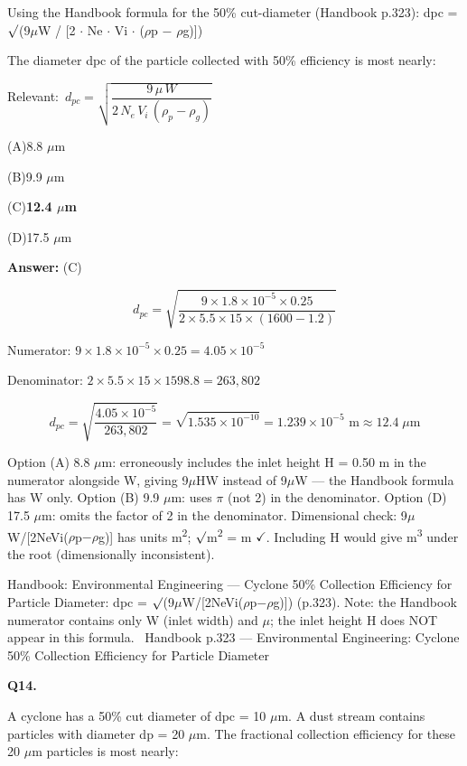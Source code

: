 \documentclass[11pt]{article}
\newcommand{\correct}[1]{\textbf{#1}\;{\color{accent}$\checkmark$}}
\newcommand{\optline}[2]{\par\noindent\hspace{1.2em}(#1)\hspace{0.6em}#2}
\begin{document}
Using the Handbook formula for the 50\% cut-diameter (Handbook p.323):
dpc = $\surd$(9$\mu$W / [2 $\cdot$ Ne $\cdot$ Vi $\cdot$ ($\rho$p $-$ $\rho$g)])

The diameter dpc of the particle collected with 50\% efficiency is most nearly:\par\vspace{3pt}
{\small\color{soft}Relevant:}\ $d_{pc} = \sqrt{\dfrac{9\,\mu\,W}{2\,N_e\,V_i\,(\rho_p - \rho_g)}}$\par\vspace{3pt}
\optline{A}{8.8 $\mu$m}
\optline{B}{9.9 $\mu$m}
\optline{C}{\correct{12.4 $\mu$m}}
\optline{D}{17.5 $\mu$m}
\par\vspace{3pt}
\vspace{2pt}\par\noindent\colorbox{boxbg}{\parbox{\dimexpr\linewidth-2\fboxsep\relax}{%
\vspace{2pt}\textbf{Answer:} (C)\par\vspace{2pt}
{\small \[d_{pc} = \sqrt{\frac{9\times1.8\times10^{-5}\times0.25}{2\times5.5\times15\times(1600-1.2)}}\]

Numerator: $9\times1.8\times10^{-5}\times0.25 = 4.05\times10^{-5}$

Denominator: $2\times5.5\times15\times1598.8 = 263{,}802$

\[d_{pc} = \sqrt{\frac{4.05\times10^{-5}}{263{,}802}} = \sqrt{1.535\times10^{-10}} = 1.239\times10^{-5}\text{ m} \approx 12.4\;\mu\text{m}\]

Option (A) 8.8 $\mu$m: erroneously includes the inlet height H = 0.50 m in the numerator alongside W, giving 9$\mu$HW instead of 9$\mu$W --- the Handbook formula has W only. Option (B) 9.9 $\mu$m: uses $\pi$ (not 2) in the denominator. Option (D) 17.5 $\mu$m: omits the factor of 2 in the denominator. Dimensional check: 9$\mu$W/[2NeVi($\rho$p$-$$\rho$g)] has units m\textsuperscript{2}; $\surd$m\textsuperscript{2} = m $\checkmark$. Including H would give m\textsuperscript{3} under the root (dimensionally inconsistent).}\par\vspace{2pt}
{\footnotesize\color{soft}Handbook: Environmental Engineering --- Cyclone 50\% Collection Efficiency for Particle Diameter: dpc = $\surd$(9$\mu$W/[2NeVi($\rho$p$-$$\rho$g)]) (p.323). Note: the Handbook numerator contains only W (inlet width) and $\mu$; the inlet height H does NOT appear in this formula. \textbullet\ Handbook p.323 --- Environmental Engineering: Cyclone 50\% Collection Efficiency for Particle Diameter}\vspace{2pt}
}}
\vspace{9pt}
\filbreak
\textbf{\color{accent}Q14.}\par\vspace{2pt}
A cyclone has a 50\% cut diameter of dpc = 10 $\mu$m. A dust stream contains particles with diameter dp = 20 $\mu$m. The fractional collection efficiency for these 20 $\mu$m particles is most nearly:
\end{document}
